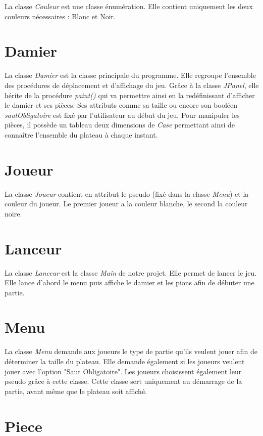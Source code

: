 \documentclass[12,french]{report}
\begin{document}
La classe \textit{Couleur} est une classe énumération. Elle contient uniquement les deux couleurs nécessaires : Blanc et Noir.

\section{Damier}

La classe \textit{Damier} est la classe principale du programme. Elle regroupe l'ensemble des procédures de déplacement et d'affichage du jeu. Grâce à la classe \textit{JPanel}, elle hérite de la procédure \textit{paint()} qui va permettre ainsi en la redéfinissant d'afficher le damier et ses pièces. Ses attributs comme sa taille ou encore son booléen \textit{sautObligatoire} est fixé par l'utilisateur au début du jeu. Pour manipuler les pièces, il possède un tableau deux dimensions de \textit{Case} permettant ainsi de connaître l'ensemble du plateau à chaque instant.

\section{Joueur}

La classe \textit{Joueur} contient en attribut le pseudo (fixé dans la classe \textit{Menu}) et la couleur du joueur. Le premier joueur a la couleur blanche, le second la couleur noire.

\section{Lanceur}

La classe \textit{Lanceur} est la classe \textit{Main} de notre projet. Elle permet de lancer le jeu. Elle lance d'abord le menu puis affiche le damier et les pions afin de débuter une partie.

\section{Menu}

La classe \textit{Menu} demande aux joueurs le type de partie qu'ils veulent jouer afin de déterminer la taille du plateau. Elle demande également si les joueurs veulent jouer avec l'option "Saut Obligatoire". Les joueurs choisissent également leur pseudo grâce à cette classe. Cette classe sert uniquement au démarrage de la partie, avant même que le plateau soit affiché.

\section{Piece}
\end{document}

